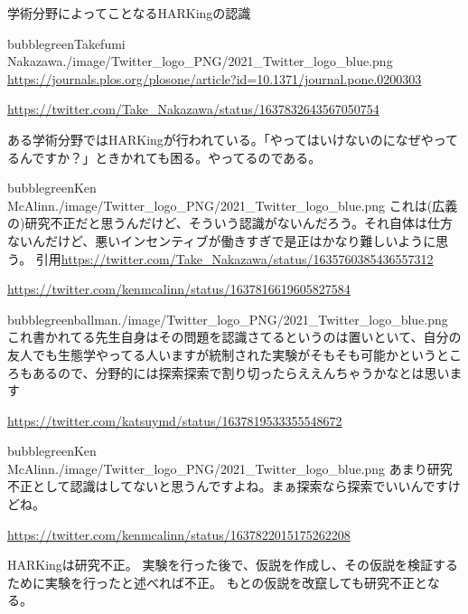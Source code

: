 \begin{SMbox}{学術分野によってことなるHARKingの認識}
 \begin{rightbubbles}{bubblegreen}{Takefumi Nakazawa}{./image/Twitter_logo_PNG/2021_Twitter_logo_blue.png}
  \url{https://journals.plos.org/plosone/article?id=10.1371/journal.pone.0200303}
  \begin{flushright} 
   \small	\url{https://twitter.com/Take_Nakazawa/status/1637832643567050754}
  \end{flushright}    
 \end{rightbubbles}

ある学術分野ではHARKingが行われている。「やってはいけないのになぜやってるんですか？」ときかれても困る。やってるのである。
 \begin{rightbubbles}{bubblegreen}{Ken McAlinn}{./image/Twitter_logo_PNG/2021_Twitter_logo_blue.png}
  これは(広義の)研究不正だと思うんだけど、そういう認識がないんだろう。それ自体は仕方ないんだけど、悪いインセンティブが働きすぎで是正はかなり難しいように思う。
  引用\url{https://twitter.com/Take_Nakazawa/status/1635760385436557312}
  \begin{flushright}
   \small	\url{https://twitter.com/kenmcalinn/status/1637816619605827584}
  \end{flushright}
 \end{rightbubbles}
 \begin{rightbubbles}{bubblegreen}{ballman}{./image/Twitter_logo_PNG/2021_Twitter_logo_blue.png}
  これ書かれてる先生自身はその問題を認識さてるというのは置いといて、自分の友人でも生態学やってる人いますが統制された実験がそもそも可能かというところもあるので、分野的には探索探索で割り切ったらええんちゃうかなとは思います
  \begin{flushright}
   \small	\url{https://twitter.com/katsuymd/status/1637819533355548672}
  \end{flushright}
 \end{rightbubbles}
 \begin{rightbubbles}{bubblegreen}{Ken McAlinn}{./image/Twitter_logo_PNG/2021_Twitter_logo_blue.png}
  あまり研究不正として認識はしてないと思うんですよね。まぁ探索なら探索でいいんですけどね。
  \begin{flushright}
   \small	\url{https://twitter.com/kenmcalinn/status/1637822015175262208}
  \end{flushright}
 \end{rightbubbles}

 HARKingは研究不正。
実験を行った後で、仮説を作成し、その仮説を検証するために実験を行ったと述べれば不正。
もとの仮説を改竄しても研究不正となる。
\end{SMbox}




